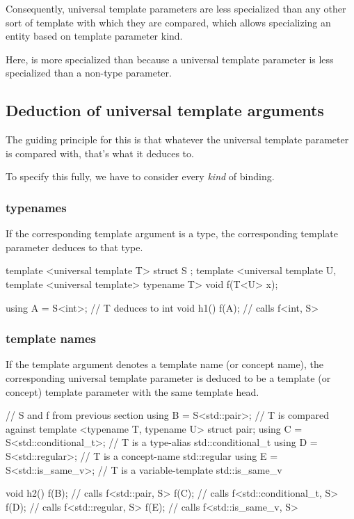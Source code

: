 \documentclass{wg21}
\begin{document}
Consequently, universal template parameters are less specialized than any other sort of template with which they are compared,
which allows specializing an entity based on template parameter kind.


Here,  is more specialized than  because a universal template parameter is less specialized than a non-type parameter.

\subsection{Deduction of universal template arguments}

The guiding principle for this is that whatever the universal template parameter is compared with, that's what it deduces to.

To specify this fully, we have to consider every \emph{kind} of binding.

\subsubsection{typenames}

If the corresponding template argument is a type, the corresponding template parameter deduces to that type.

\begin{colorblock}
template <universal template T>
struct S {};
template <universal template U, template <universal template> typename T>
void f(T<U> x);

using A = S<int>; // T deduces to int
void h1() {
  f(A{}); // calls f<int, S>
}
\end{colorblock}

\subsubsection{template names}

If the template argument denotes a template name (or concept name), the corresponding universal template parameter
is deduced to be a template (or concept) template parameter with the same template head.

\begin{colorblock}
// S and f from previous section
using B = S<std::pair>; // T is compared against template <typename T, typename U> struct pair;
using C = S<std::conditional_t>; // T is a type-alias std::conditional_t
using D = S<std::regular>; // T is a concept-name std::regular
using E = S<std::is_same_v>; // T is a variable-template std::is_same_v

void h2() {
  f(B{}); // calls f<std::pair, S>
  f(C{}); // calls f<std::conditional_t, S>
  f(D{}); // calls f<std::regular, S>
  f(E{}); // calls f<std::is_same_v, S>
}
\end{colorblock}
\end{document}
